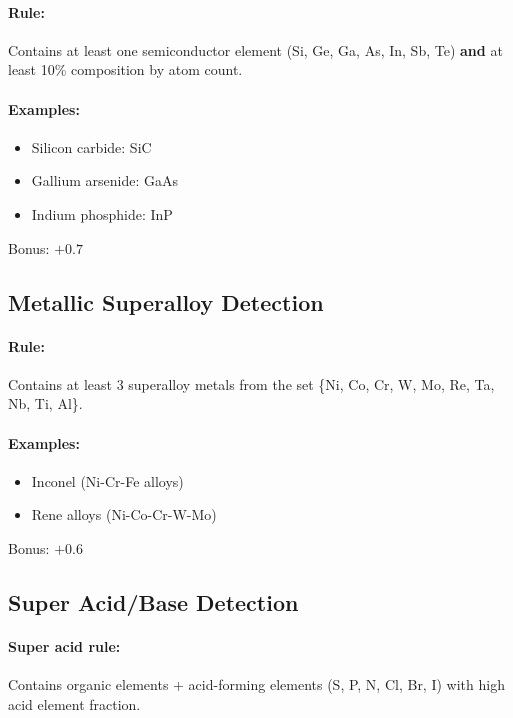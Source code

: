 \documentclass[11pt]{article}
\begin{document}
\paragraph{Rule:} Contains at least one semiconductor element (Si, Ge, Ga, As, In, Sb, Te) \textbf{and} at least 10\% composition by atom count.

\paragraph{Examples:}
\begin{itemize}
\item Silicon carbide: SiC
\item Gallium arsenide: GaAs
\item Indium phosphide: InP
\end{itemize}

Bonus: $+0.7$

\subsection{Metallic Superalloy Detection}

\paragraph{Rule:} Contains at least 3 superalloy metals from the set \{Ni, Co, Cr, W, Mo, Re, Ta, Nb, Ti, Al\}.

\paragraph{Examples:}
\begin{itemize}
\item Inconel (Ni-Cr-Fe alloys)
\item Rene alloys (Ni-Co-Cr-W-Mo)
\end{itemize}

Bonus: $+0.6$

\subsection{Super Acid/Base Detection}

\paragraph{Super acid rule:} Contains organic elements + acid-forming elements (S, P, N, Cl, Br, I) with high acid element fraction.
\end{document}
